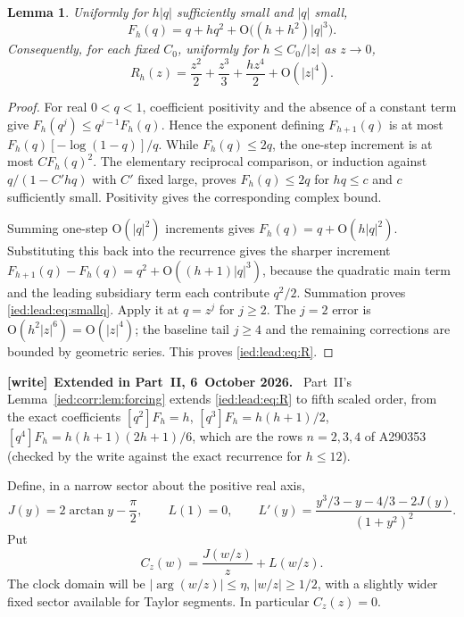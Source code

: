 \documentclass[11pt,letterpaper]{article}
\newtheorem{lemma}[theorem]{Lemma}
\theoremstyle{remark}\newtheorem{remark}[theorem]{Remark}
\newcommand{\Oh}{\mathrm O}\newcommand{\supp}{\operatorname{supp}}
\newenvironment{writenote}[1][]{\par\smallskip\begingroup\small
 \noindent\textbf{[write]}\if\relax\detokenize{#1}\relax\else~\textbf{#1.}\fi\ }%
 {\par\endgroup\smallskip}
\begin{document}
\begin{lemma}\label{ied:lead:lem:subsidiary}
Uniformly for $h|q|$ sufficiently small and $|q|$ small,
\begin{equation}\label{ied:lead:eq:smallq}
 F_h(q)=q+hq^2+\Oh\bigl((h+h^2)|q|^3\bigr).
\end{equation}
Consequently, for each fixed $C_0$, uniformly for $h\le C_0/|z|$ as $z\to0$,
\begin{equation}\label{ied:lead:eq:R}
 R_h(z)=\frac{z^2}2+\frac{z^3}3+\frac{hz^4}2+\Oh(|z|^4).
\end{equation}
\end{lemma}
\begin{proof}
For real $0<q<1$, coefficient positivity and the absence of a constant term give
$F_h(q^j)\le q^{j-1}F_h(q)$. Hence the exponent defining $F_{h+1}(q)$ is at most $F_h(q)[-\log(1-q)]/q$. While $F_h(q)\le2q$, the one-step increment is at most $C F_h(q)^2$. The elementary reciprocal comparison, or induction against $q/(1-C'hq)$ with $C'$ fixed large, proves $F_h(q)\le2q$ for $hq\le c$ and $c$ sufficiently small. Positivity gives the corresponding complex bound.

Summing one-step $\Oh(|q|^2)$ increments gives $F_h(q)=q+\Oh(h|q|^2)$. Substituting this back into the recurrence gives the sharper increment
$F_{h+1}(q)-F_h(q)=q^2+\Oh((h+1)|q|^3)$, because the quadratic main term and the leading subsidiary term each contribute $q^2/2$. Summation proves \eqref{ied:lead:eq:smallq}. Apply it at $q=z^j$ for $j\ge2$. The $j=2$ error is $\Oh(h^2|z|^6)=\Oh(|z|^4)$; the baseline tail $j\ge4$ and the remaining corrections are bounded by geometric series. This proves \eqref{ied:lead:eq:R}.
\end{proof}

\begin{writenote}[Extended in Part~II, 6~October 2026]
Part~II's Lemma~\ref{ied:corr:lem:forcing} extends \eqref{ied:lead:eq:R} to fifth scaled order, from the exact coefficients $[q^2]F_h=h$, $[q^3]F_h=h(h+1)/2$, $[q^4]F_h=h(h+1)(2h+1)/6$, which are the rows $n=2,3,4$ of A290353 (checked by the write against the exact recurrence for $h\le12$).
\end{writenote}

Define, in a narrow sector about the positive real axis,
\begin{equation}\label{ied:lead:eq:JL}
 J(y)=2\arctan y-\frac\pi2,\qquad L(1)=0,\qquad
 L'(y)=\frac{y^3/3-y-4/3-2J(y)}{(1+y^2)^2}.
\end{equation}
Put
\begin{equation}\label{ied:lead:eq:clock}
 C_z(w)=\frac{J(w/z)}z+L(w/z).
\end{equation}
The clock domain will be $|\arg(w/z)|\le\eta$, $|w/z|\ge1/2$, with a slightly wider fixed sector available for Taylor segments. In particular $C_z(z)=0$.
\end{document}

